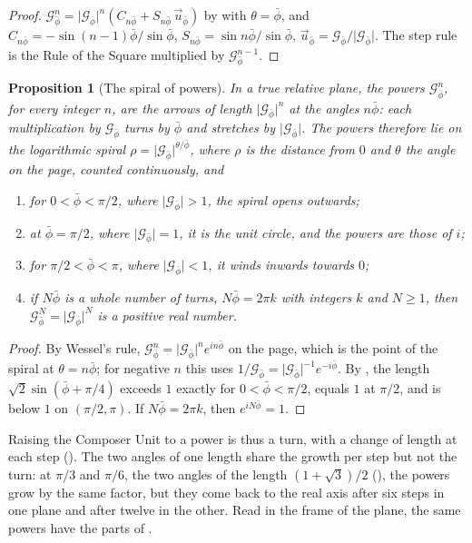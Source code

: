 \documentclass[11pt,a4paper]{amsart}
\theoremstyle{plain}
\newtheorem{proposition}[theorem]{Proposition}
\theoremstyle{definition}
\theoremstyle{remark}
\newcommand{\pb}{\bar{\phi}}                     %
\newcommand{\Gp}{\mathcal{G}_{\bar{\phi}}}       %
\newcommand{\up}{\vec{u}_{\bar{\phi}}}           %
\begin{document}
\begin{proof}
$\Gp^n = \lvert\Gp\rvert^n(C_{n\pb} + S_{n\pb}\,\up)$ by  with $\theta = \pb$, and $C_{n\pb} = -\sin(n - 1)\pb/\sin\pb$, $S_{n\pb} = \sin n\pb/\sin\pb$, $\up = \Gp/\lvert\Gp\rvert$. The step rule is the Rule of the Square multiplied by $\Gp^{n-1}$.
\end{proof}

\begin{proposition}[The spiral of powers]\label{prop:spiral}
In a true relative plane, the powers $\Gp^n$, for every integer $n$, are the arrows of length $\lvert\Gp\rvert^n$ at the angles $n\pb$: each multiplication by $\Gp$ turns by $\pb$ and stretches by $\lvert\Gp\rvert$. The powers therefore lie on the logarithmic spiral $\rho = \lvert\Gp\rvert^{\theta/\pb}$, where $\rho$ is the distance from $0$ and $\theta$ the angle on the page, counted continuously, and
\begin{enumerate}
  \item for $0 < \pb < \pi/2$, where $\lvert\Gp\rvert > 1$, the spiral opens outwards;
  \item at $\pb = \pi/2$, where $\lvert\Gp\rvert = 1$, it is the unit circle, and the powers are those of $i$;
  \item for $\pi/2 < \pb < \pi$, where $\lvert\Gp\rvert < 1$, it winds inwards towards $0$;
  \item if $N\pb$ is a whole number of turns, $N\pb = 2\pi k$ with integers $k$ and $N \geq 1$, then $\Gp^N = \lvert\Gp\rvert^N$ is a positive real number.
\end{enumerate}
\end{proposition}

\begin{proof}
By Wessel's rule, $\Gp^n = \lvert\Gp\rvert^n e^{in\pb}$ on the page, which is the point of the spiral at $\theta = n\pb$; for negative $n$ this uses $1/\Gp = \lvert\Gp\rvert^{-1}e^{-i\pb}$. By , the length $\sqrt{2}\sin(\pb + \pi/4)$ exceeds $1$ exactly for $0 < \pb < \pi/2$, equals $1$ at $\pi/2$, and is below $1$ on $(\pi/2, \pi)$. If $N\pb = 2\pi k$, then $e^{iN\pb} = 1$.
\end{proof}

Raising the Composer Unit to a power is thus a turn, with a change of length at each step (). The two angles of one length share the growth per step but not the turn: at $\pi/3$ and $\pi/6$, the two angles of the length $(1 + \sqrt{3})/2$ (), the powers grow by the same factor, but they come back to the real axis after six steps in one plane and after twelve in the other. Read in the frame of the plane, the same powers have the parts of .
\end{document}
